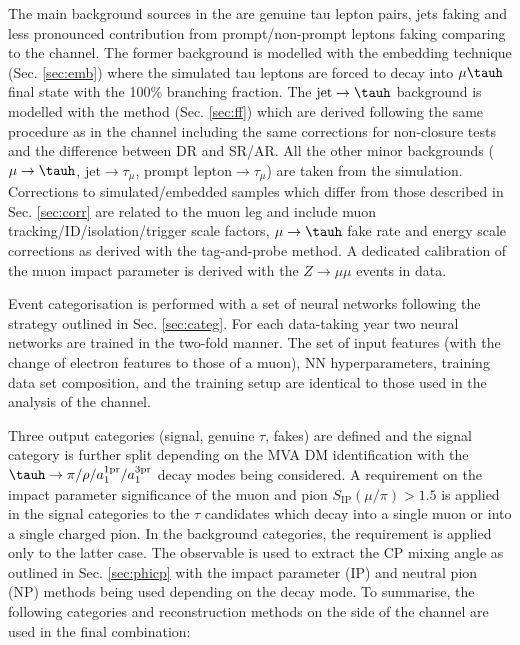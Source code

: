 The main background sources in the \mt are genuine tau lepton pairs, jets faking \tauh and less pronounced contribution from prompt/non-prompt leptons faking \tauh comparing to the \et channel. The former background is modelled with the embedding technique (Sec. \ref{sec:emb}) where the simulated tau leptons are forced to decay into $\mu\tauh$ final state with the 100\% branching fraction. The $\text{jet} \to \tauh$ background is modelled with the \ff method (Sec. \ref{sec:ff}) which are derived following the same procedure as in the \et channel including the same corrections for non-closure tests and the difference between DR and SR/AR. All the other minor backgrounds ($\mu \to \tauh$, $\text{jet} \to \tau_\mu$, $\text{prompt lepton} \to \tau_\mu$) are taken from the simulation. Corrections to simulated/embedded samples which differ from those described in Sec. \ref{sec:corr} are related to the muon leg and include muon tracking/ID/isolation/trigger scale factors, $\mu \to \tauh$ fake rate and energy scale corrections as derived with the tag-and-probe method. A dedicated calibration of the muon impact parameter is derived with the $Z\to\mu\mu$ events in data.

Event categorisation is performed with a set of neural networks following the strategy outlined in Sec. \ref{sec:categ}. For each data-taking year two neural networks are trained in the two-fold manner. The set of input features (with the change of electron features to those of a muon), NN hyperparameters, training data set composition, and the training setup are identical to those used in the analysis of the \et channel. 

Three output categories (signal, genuine $\tau$, fakes) are defined and the signal category is further split depending on the \tauh MVA DM identification with the $\tauh \to \pi/\rho/a_1^\text{1pr}/a_1^\text{3pr}$ decay modes being considered. A requirement on the impact parameter significance of the muon and pion $S_\text{IP} (\mu/\pi) > 1.5$ is applied in the signal categories to the $\tau$ candidates which decay into a single muon or into a single charged pion. In the background categories, the requirement is applied only to the latter case. The \phicp observable is used to extract the CP mixing angle \mixa as outlined in Sec. \ref{sec:phicp} with the impact parameter (IP) and neutral pion (NP) methods being used depending on the \tauh decay mode. To summarise, the following categories and \phicp reconstruction methods on the side of the \mt channel are used in the final combination:  

